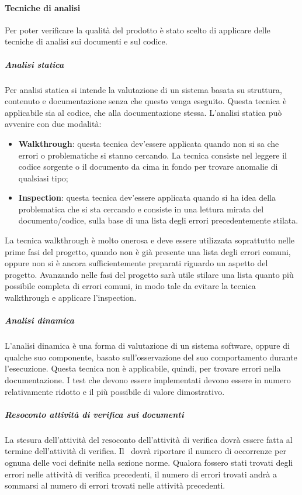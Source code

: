 \documentclass[../NormeProgetto.tex]{subfiles}
\begin{document}
	\paragraph{Tecniche di analisi}
	Per poter verificare la qualità del prodotto è stato scelto di applicare delle tecniche di analisi sui documenti e sul codice. 
		\subparagraph{Analisi statica} Per analisi statica si intende la valutazione di un sistema basata su struttura, contenuto e documentazione senza che questo venga eseguito. Questa tecnica è applicabile sia al codice, che alla documentazione stessa. L'analisi statica può avvenire con due modalità:
		\begin{itemize}
			\item \textbf{Walkthrough}: questa tecnica dev'essere applicata quando non si sa che errori o problematiche si stanno cercando. La tecnica consiste nel leggere il codice sorgente o il documento da cima in fondo per trovare anomalie  di qualsiasi tipo;
			\item \textbf{Inspection}: questa tecnica dev'essere applicata quando si ha idea della problematica che si sta cercando e consiste in una lettura mirata del documento/codice, sulla base di una lista degli errori precedentemente stilata.
		\end{itemize}
		La tecnica walkthrough è molto onerosa e deve essere utilizzata soprattutto nelle prime fasi del progetto, quando non è già presente una lista degli errori comuni, oppure non si è ancora sufficientemente preparati riguardo un aspetto del progetto. Avanzando nelle fasi del progetto sarà utile stilare una lista quanto più possibile completa di errori comuni, in modo tale da evitare la tecnica walkthrough e applicare l'inspection.
		
		\subparagraph{Analisi dinamica}
		L’analisi dinamica è una forma di valutazione di un sistema software, oppure di qualche suo componente, basato sull'osservazione del suo comportamento durante l'esecuzione. Questa tecnica non è applicabile, quindi, per trovare errori nella documentazione. I test che devono essere implementati devono essere in numero relativamente ridotto e il più possibile di valore dimostrativo.
		
		\subparagraph{Resoconto attività di verifica sui documenti}	
		La stesura dell'attività del resoconto dell'attività di verifica dovrà essere fatta al termine dell'attività di verifica. Il \verificatore\ dovrà riportare il numero di occorrenze per ognuna delle voci definite nella sezione norme. Qualora fossero stati trovati degli errori nelle attività di verifica precedenti, il numero di errori trovati andrà a sommarsi al numero di errori trovati nelle attività precedenti.
		
\end{document}
